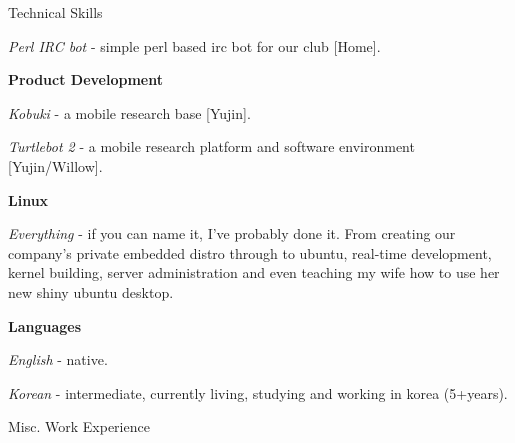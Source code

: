 \documentclass[a4paper,10pt]{article}
\begin{document}
\begin{cvsection}{Technical Skills}
\begin{djs_itemize}
\begin{djs_itemize}
      \item \textit{Perl IRC bot} - simple perl based irc bot for our club [Home].
    \end{djs_itemize}
    \item \textbf{Product Development}
    \begin{djs_itemize}
      \item \textit{Kobuki} - a mobile research base [Yujin].
      \item \textit{Turtlebot 2} - a mobile research platform and software environment [Yujin/Willow].
    \end{djs_itemize}
    \item \textbf{Linux}
    \begin{djs_itemize}
      \item \textit{Everything} - if you can name it, I've probably done it. From creating our company's private embedded distro through to ubuntu, real-time development, kernel building, server administration and even teaching my wife how to use her new shiny ubuntu desktop.
    \end{djs_itemize}
    \item \textbf{Languages}
    \begin{djs_itemize}
      \item \textit{English} - native.
      \item \textit{Korean} - intermediate, currently living, studying and working in korea (5+years).
    \end{djs_itemize}
  \end{djs_itemize}
\end{cvsection}

\begin{cvsection}{Misc. Work Experience}
  \raggedright
\end{cvsection}

\end{document}
